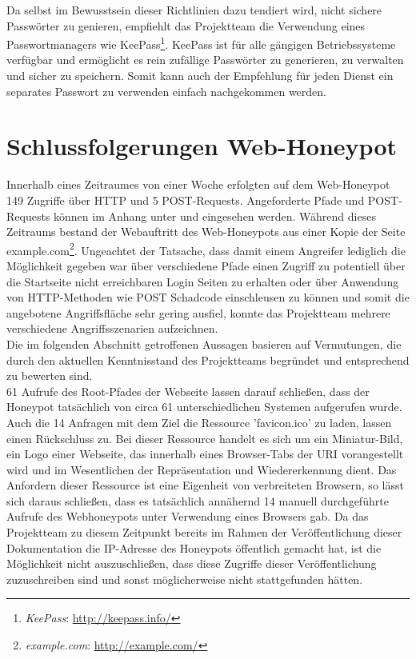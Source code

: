 Da selbst im Bewusstsein dieser Richtlinien dazu tendiert wird, nicht sichere Passwörter zu genieren, empfiehlt das Projektteam die Verwendung eines Passwortmanagers wie KeePass\footnote{ \textit{KeePass}: \url{http://keepass.info/}}. KeePass ist für alle gängigen Betriebssysteme verfügbar und ermöglicht es rein zufällige Passwörter zu generieren, zu verwalten und sicher zu speichern. Somit kann auch der Empfehlung für jeden Dienst ein separates Passwort zu verwenden einfach nachgekommen werden.

\section{Schlussfolgerungen Web-Honeypot}
\label{sec:Schlussfolgerungen Web-Honeypot}

Innerhalb eines Zeitraumes von einer Woche erfolgten auf dem Web-Honeypot 149 Zugriffe über HTTP und 5 POST-Requests. Angeforderte Pfade und POST-Requests können im Anhang unter  und  eingesehen werden. Während dieses Zeitraums bestand der Webauftritt des Web-Honeypots aus einer Kopie der Seite example.com\footnote{ \textit{example.com}: \url{http://example.com/}}. Ungeachtet der Tatsache, dass damit einem Angreifer lediglich die Möglichkeit gegeben war über verschiedene Pfade einen Zugriff zu potentiell über die Startseite nicht erreichbaren Login Seiten zu erhalten oder über Anwendung von HTTP-Methoden wie POST Schadcode einschleusen zu können und somit die angebotene Angriffsfläche sehr gering ausfiel, konnte das Projektteam mehrere verschiedene Angriffsszenarien aufzeichnen.\\

Die im folgenden Abschnitt getroffenen Aussagen basieren auf Vermutungen, die durch den aktuellen Kenntnisstand des Projektteams begründet und entsprechend zu bewerten sind.\\

61 Aufrufe des Root-Pfades der Webseite lassen darauf schließen, dass der Honeypot tatsächlich von circa 61 unterschiedlichen Systemen aufgerufen wurde. Auch die 14 Anfragen mit dem Ziel die Ressource 'favicon.ico' zu laden, lassen einen Rückschluss zu.  Bei dieser Ressource handelt es sich um ein Miniatur-Bild, ein Logo einer Webseite, das innerhalb eines Browser-Tabs der URI vorangestellt wird und im Wesentlichen der Repräsentation und Wiedererkennung dient. Das Anfordern dieser Ressource ist eine Eigenheit von verbreiteten Browsern, so lässt sich daraus schließen, dass es tatsächlich annähernd 14 manuell durchgeführte Aufrufe des Webhoneypots unter Verwendung eines Browsers gab. Da das Projektteam zu diesem Zeitpunkt bereits im Rahmen der Veröffentlichung dieser Dokumentation die IP-Adresse des Honeypots öffentlich gemacht hat, ist die Möglichkeit nicht auszuschließen, dass diese Zugriffe dieser Veröffentlichung zuzuschreiben sind und sonst möglicherweise nicht stattgefunden hätten.\\ 


